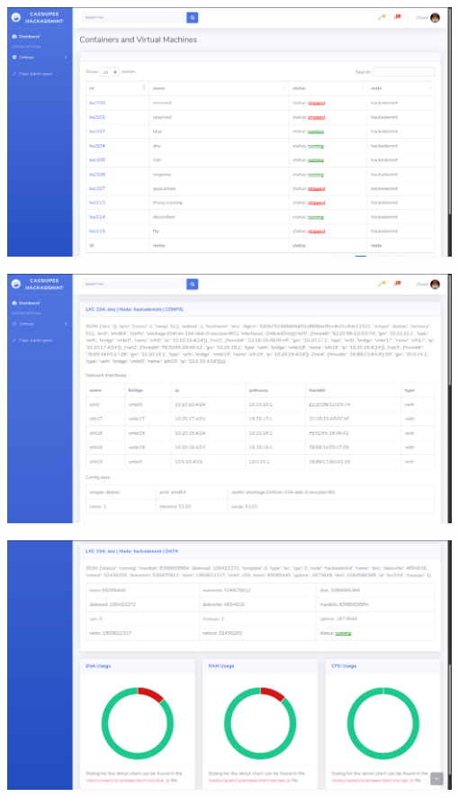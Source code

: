 \vspace{1cm}
\begin{center}
\includegraphics[width=0.98\textwidth]{images/flask-application-1.png}
\end{center}
\vspace{1cm}
\begin{center}
\includegraphics[width=0.98\textwidth]{images/flask-application-2.png}
\end{center}
\vspace{1cm}
\begin{center}
\includegraphics[width=0.98\textwidth]{images/flask-application-3.png}
\end{center}


